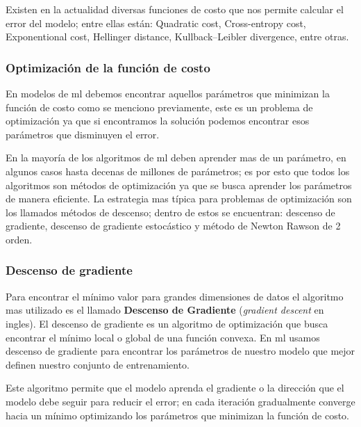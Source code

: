 Existen en la actualidad diversas funciones de costo que nos permite calcular el error del modelo; entre ellas están: Quadratic cost, Cross-entropy cost, Exponentional cost, Hellinger distance, Kullback–Leibler divergence, entre otras.


\subsubsection{Optimización de la función de costo} 
En modelos de \ac{ml} debemos encontrar aquellos parámetros que minimizan la función de costo como se menciono previamente, este es un problema de optimización ya que si encontramos la solución podemos encontrar esos parámetros que disminuyen el error.

En la mayoría de los algoritmos de \ac{ml} deben aprender mas de un parámetro, en algunos casos hasta decenas de millones de parámetros; es por esto que todos los algoritmos  son métodos de optimización ya que se busca aprender los parámetros de manera eficiente. La estrategia mas típica para problemas de optimización son los llamados métodos de descenso; dentro de estos se encuentran: descenso de gradiente, descenso de gradiente estocástico y método de Newton Rawson de 2 orden.

\subsubsection{Descenso de gradiente}\label{sub:gradient-desc}
Para encontrar el mínimo valor para grandes dimensiones de datos el algoritmo mas utilizado es el llamado \textbf{Descenso de Gradiente} (\textit{gradient descent} en ingles). El descenso de gradiente es un algoritmo de optimización que busca encontrar el mínimo local o global de una función convexa.  En \ac{ml} usamos descenso de gradiente para encontrar los parámetros de nuestro modelo que mejor definen nuestro conjunto de entrenamiento.

Este algoritmo permite que el modelo aprenda el gradiente o la dirección que el modelo debe seguir para reducir el error; en cada iteración gradualmente converge hacia un mínimo optimizando los parámetros que minimizan la función de costo. 


